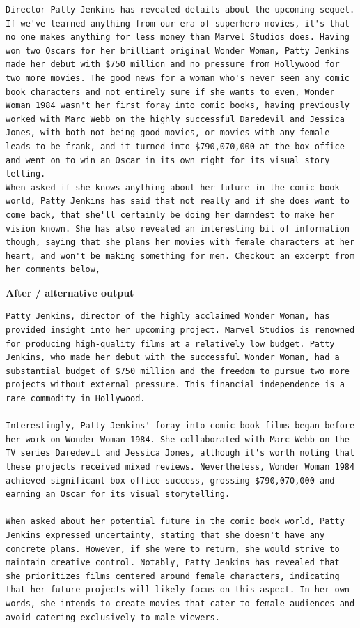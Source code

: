 \begin{Verbatim}
Director Patty Jenkins has revealed details about the upcoming sequel.
If we've learned anything from our era of superhero movies, it's that no one makes anything for less money than Marvel Studios does. Having won two Oscars for her brilliant original Wonder Woman, Patty Jenkins made her debut with $750 million and no pressure from Hollywood for two more movies. The good news for a woman who's never seen any comic book characters and not entirely sure if she wants to even, Wonder Woman 1984 wasn't her first foray into comic books, having previously worked with Marc Webb on the highly successful Daredevil and Jessica Jones, with both not being good movies, or movies with any female leads to be frank, and it turned into $790,070,000 at the box office and went on to win an Oscar in its own right for its visual story telling.
When asked if she knows anything about her future in the comic book world, Patty Jenkins has said that not really and if she does want to come back, that she'll certainly be doing her damndest to make her vision known. She has also revealed an interesting bit of information though, saying that she plans her movies with female characters at her heart, and won't be making something for men. Checkout an excerpt from her comments below,
\end{Verbatim}

\textbf{After / alternative output}

\begin{Verbatim}
Patty Jenkins, director of the highly acclaimed Wonder Woman, has provided insight into her upcoming project. Marvel Studios is renowned for producing high-quality films at a relatively low budget. Patty Jenkins, who made her debut with the successful Wonder Woman, had a substantial budget of $750 million and the freedom to pursue two more projects without external pressure. This financial independence is a rare commodity in Hollywood.

Interestingly, Patty Jenkins' foray into comic book films began before her work on Wonder Woman 1984. She collaborated with Marc Webb on the TV series Daredevil and Jessica Jones, although it's worth noting that these projects received mixed reviews. Nevertheless, Wonder Woman 1984 achieved significant box office success, grossing $790,070,000 and earning an Oscar for its visual storytelling.

When asked about her potential future in the comic book world, Patty Jenkins expressed uncertainty, stating that she doesn't have any concrete plans. However, if she were to return, she would strive to maintain creative control. Notably, Patty Jenkins has revealed that she prioritizes films centered around female characters, indicating that her future projects will likely focus on this aspect. In her own words, she intends to create movies that cater to female audiences and avoid catering exclusively to male viewers.
\end{Verbatim}

